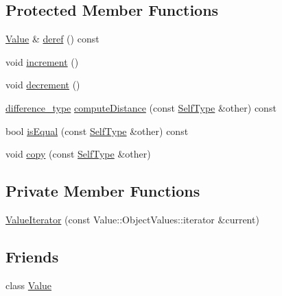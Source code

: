 \subsection*{Protected Member Functions}
\begin{DoxyCompactItemize}
\item 
\hyperlink{classJson_1_1Value}{Value} \& \hyperlink{classJson_1_1ValueIteratorBase_a40a20c65abc423a26e3aae68d9a0525c}{deref} () const 
\item 
void \hyperlink{classJson_1_1ValueIteratorBase_afe58f9534e1fd2033419fd9fe244551e}{increment} ()
\item 
void \hyperlink{classJson_1_1ValueIteratorBase_affc8cf5ff54a9f432cc693362c153fa6}{decrement} ()
\item 
\hyperlink{classJson_1_1ValueIteratorBase_a4e44bf8cbd17ec8d6e2c185904a15ebd}{difference\+\_\+type} \hyperlink{classJson_1_1ValueIteratorBase_ad6c553b249e89e3dc9933e100ccbe064}{compute\+Distance} (const \hyperlink{classJson_1_1ValueIteratorBase_a9d2a940d03ea06d20d972f41a89149ee}{Self\+Type} \&other) const 
\item 
bool \hyperlink{classJson_1_1ValueIteratorBase_a21820d6ee564e541bd118b21e4741962}{is\+Equal} (const \hyperlink{classJson_1_1ValueIteratorBase_a9d2a940d03ea06d20d972f41a89149ee}{Self\+Type} \&other) const 
\item 
void \hyperlink{classJson_1_1ValueIteratorBase_a496e6aba44808433ec5858c178be5719}{copy} (const \hyperlink{classJson_1_1ValueIteratorBase_a9d2a940d03ea06d20d972f41a89149ee}{Self\+Type} \&other)
\end{DoxyCompactItemize}
\subsection*{Private Member Functions}
\begin{DoxyCompactItemize}
\item 
\hyperlink{classJson_1_1ValueIterator_afb06ea21add440c78c27dc49570460a5}{Value\+Iterator} (const Value\+::\+Object\+Values\+::iterator \&current)
\end{DoxyCompactItemize}
\subsection*{Friends}
\begin{DoxyCompactItemize}
\item 
class \hyperlink{classJson_1_1ValueIterator_aeceedf6e1a7d48a588516ce2b1983d6f}{Value}
\end{DoxyCompactItemize}


